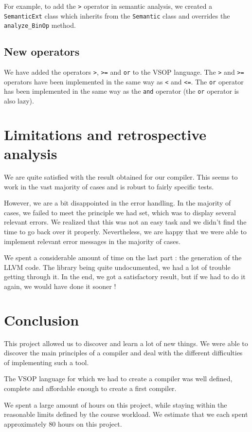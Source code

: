 \documentclass[a4paper, 12pt]{article}
\begin{document}
    For example, to add the \texttt{>} operator in semantic analysis, we created a \texttt{SemanticExt} class which inherits from the \texttt{Semantic} class and overrides the \texttt{analyze\_BinOp} method.
    
    \subsection{New operators}
    
    We have added the operators \texttt{>}, \texttt{>=} and \texttt{or} to the VSOP language. The \texttt{>} and \texttt{>=} operators have been implemented in the same way as \texttt{<} and \texttt{<=}. The \texttt{or} operator has been implemented in the same way as the \texttt{and} operator (the \texttt{or} operator is also lazy).
    
    
    \section{Limitations and retrospective analysis}
    
    We are quite satisfied with the result obtained for our compiler. This seems to work in the vast majority of cases and is robust to fairly specific tests.
    
    However, we are a bit disappointed in the error handling. In the majority of cases, we failed to meet the principle we had set, which was to display several relevant errors. We realized that this was not an easy task and we didn't find the time to go back over it properly. Nevertheless, we are happy that we were able to implement relevant error messages in the majority of cases.
    
    We spent a considerable amount of time on the last part : the generation of the LLVM code. The library being quite undocumented, we had a lot of trouble getting through it. In the end, we got a satisfactory result, but if we had to do it again, we would have done it sooner !
    
    
    \section{Conclusion}
    
    This project allowed us to discover and learn a lot of new things. We were able to discover the main principles of a compiler and deal with the different difficulties of implementing such a tool.
    
    The VSOP language for which we had to create a compiler was well defined, complete and affordable enough to create a first compiler.
    
    We spent a large amount of hours on this project, while staying within the reasonable limits defined by the course workload. We estimate that we each spent approximately 80 hours on this project.
\end{document}
